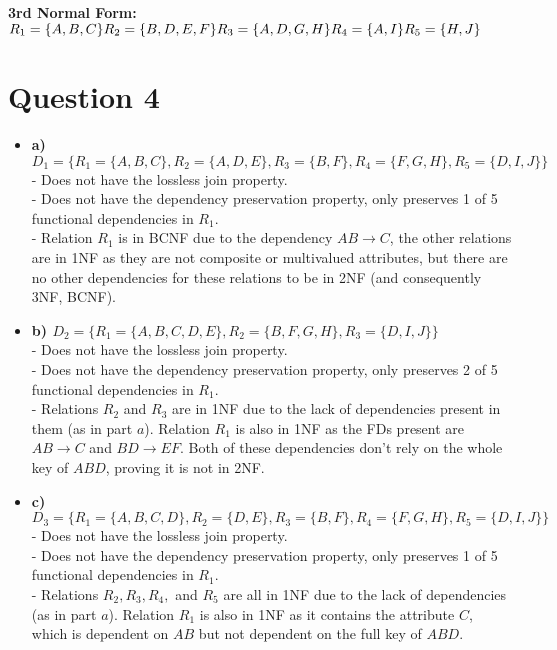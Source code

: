 \documentclass{article}
\begin{document}
\textbf{3rd Normal Form:} \\
$R_1 = \{A, B, C\} \\
R_2 = \{B, D, E, F\} \\
R_3 = \{A, D, G, H\} \\
R_4 = \{A, I\} \\
R_5 = \{H, J\} \\
$


\section*{Question 4}
\begin{itemize}
\item \textbf{a) $D_1 = \{ R_1 = \{A, B, C\}, R_2 = \{A, D, E\}, R_3 = \{B, F\}, R_4 = \{F, G, H\}, R_5 = \{D, I, J\} \}$} \\
 - Does not have the lossless join property. \\
 - Does not have the dependency preservation property, only preserves 1 of 5 functional dependencies in $R_1$. \\
 - Relation $R_1$ is in BCNF due to the dependency $AB \rightarrow C$, the other relations are in 1NF as they are not composite or multivalued attributes, but there are no other dependencies for these relations to be in 2NF (and consequently 3NF, BCNF).

\item \textbf{b) $D_2 = \{ R_1 = \{A, B, C, D, E\}, R_2 = \{B, F, G, H\}, R_3 = \{D, I, J\} \}$} \\
 - Does not have the lossless join property. \\
 - Does not have the dependency preservation property, only preserves 2 of 5 functional dependencies in $R_1$. \\
 - Relations $R_2$ and $R_3$ are in 1NF due to the lack of dependencies present in them (as in part $a$). Relation $R_1$ is also in 1NF as the FDs present are $AB \rightarrow C$ and $BD \rightarrow EF$. Both of these dependencies don't rely on the whole key of $ABD$, proving it is not in 2NF.

\item \textbf{c) $D_3 = \{ R_1 = \{A, B, C, D\}, R_2 = \{D, E\}, R_3 = \{B, F\}, R_4 = \{F, G, H\}, R_5 = \{D, I, J\} \}$} \\
 - Does not have the lossless join property. \\
 - Does not have the dependency preservation property, only preserves 1 of 5 functional dependencies in $R_1$. \\
 - Relations $R_2, R_3, R_4,$ and $R_5$ are all in 1NF due to the lack of dependencies (as in part $a$). Relation $R_1$ is also in 1NF as it contains the attribute $C$, which is dependent on $AB$ but not dependent on the full key of $ABD$.
\end{itemize}
\end{document}
